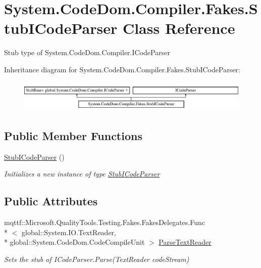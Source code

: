 \hypertarget{class_system_1_1_code_dom_1_1_compiler_1_1_fakes_1_1_stub_i_code_parser}{\section{System.\-Code\-Dom.\-Compiler.\-Fakes.\-Stub\-I\-Code\-Parser Class Reference}
\label{class_system_1_1_code_dom_1_1_compiler_1_1_fakes_1_1_stub_i_code_parser}
}


Stub type of System.\-Code\-Dom.\-Compiler.\-I\-Code\-Parser 


Inheritance diagram for System.\-Code\-Dom.\-Compiler.\-Fakes.\-Stub\-I\-Code\-Parser\-:\begin{figure}[H]
\begin{center}
\leavevmode
\includegraphics[height=1.542700cm]{class_system_1_1_code_dom_1_1_compiler_1_1_fakes_1_1_stub_i_code_parser}
\end{center}
\end{figure}
\subsection*{Public Member Functions}
\begin{DoxyCompactItemize}
\item 
\hyperlink{class_system_1_1_code_dom_1_1_compiler_1_1_fakes_1_1_stub_i_code_parser_a16547fe7ff9938068e56081fe3ce38a4}{Stub\-I\-Code\-Parser} ()
\begin{DoxyCompactList}\small\item\em Initializes a new instance of type \hyperlink{class_system_1_1_code_dom_1_1_compiler_1_1_fakes_1_1_stub_i_code_parser}{Stub\-I\-Code\-Parser}\end{DoxyCompactList}\end{DoxyCompactItemize}
\subsection*{Public Attributes}
\begin{DoxyCompactItemize}
\item 
mqttf\-::\-Microsoft.\-Quality\-Tools.\-Testing.\-Fakes.\-Fakes\-Delegates.\-Func\\*
$<$ global\-::\-System.\-I\-O.\-Text\-Reader, \\*
global\-::\-System.\-Code\-Dom.\-Code\-Compile\-Unit $>$ \hyperlink{class_system_1_1_code_dom_1_1_compiler_1_1_fakes_1_1_stub_i_code_parser_a060bc9a890337b726c744a6c9f44222e}{Parse\-Text\-Reader}
\begin{DoxyCompactList}\small\item\em Sets the stub of I\-Code\-Parser.\-Parse(\-Text\-Reader code\-Stream)\end{DoxyCompactList}\end{DoxyCompactItemize}



